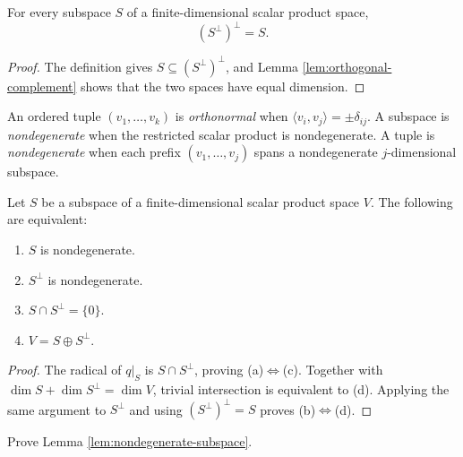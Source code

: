 \begin{lemma}
\label{lem:orthogonal-complement-involution}
\leanok
{}
For every subspace $S$ of a finite-dimensional scalar product space,
\[
(S^\perp)^\perp=S.
\]
\end{lemma}

\begin{proof}
\leanok
{}
\sketch The definition gives $S\subseteq(S^\perp)^\perp$, and Lemma
\ref{lem:orthogonal-complement} shows that the two spaces have equal dimension.
\end{proof}

An ordered tuple $(v_1,\ldots,v_k)$ is \emph{orthonormal} when
$\langle v_i,v_j\rangle=\pm\delta_{ij}$. A subspace is \emph{nondegenerate} when
the restricted scalar product is nondegenerate. A tuple is \emph{nondegenerate}
when each prefix $(v_1,\ldots,v_j)$ spans a nondegenerate $j$-dimensional
subspace.

\begin{lemma}\label{lem:nondegenerate-subspace}
\leanok
{}
Let $S$ be a subspace of a finite-dimensional scalar product space $V$. The
following are equivalent:
\begin{enumerate}[label=(\alph*)]
\item $S$ is nondegenerate.
\item $S^\perp$ is nondegenerate.
\item $S\cap S^\perp=\{0\}$.
\item $V=S\oplus S^\perp$.
\end{enumerate}
\end{lemma}

\begin{proof}
\leanok
{}
\sketch The radical of $q|_S$ is $S\cap S^\perp$, proving (a)$\Leftrightarrow$(c).
Together with $\dim S+\dim S^\perp=\dim V$, trivial intersection is equivalent to
(d). Applying the same argument to $S^\perp$ and using
$(S^\perp)^\perp=S$ proves (b)$\Leftrightarrow$(d).
\end{proof}

\begin{exercise}\label{exer:preceding-lemma-nondegenerate}
\leanok
{}
Prove Lemma \ref{lem:nondegenerate-subspace}.
\end{exercise}

